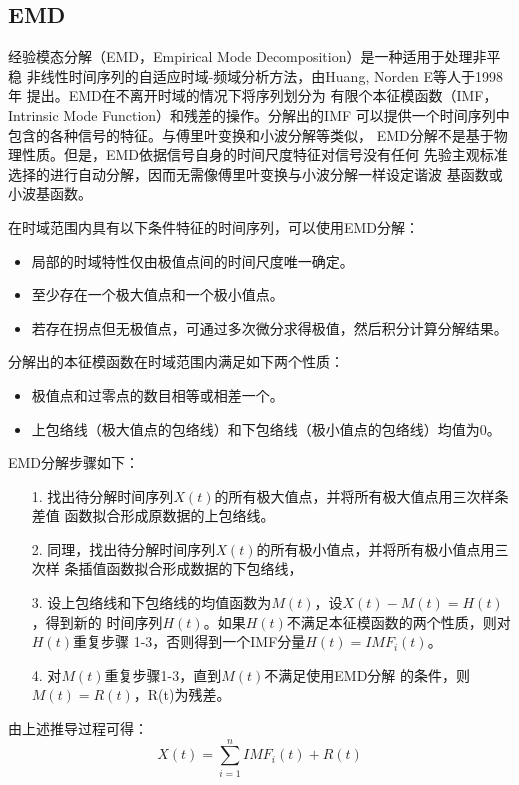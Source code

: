 \documentclass[AutoFakeBold]{LZUThesis}
\begin{document}
\subsection{EMD}
经验模态分解（EMD，Empirical Mode Decomposition）是一种适用于处理非平稳
非线性时间序列的自适应时域-频域分析方法，由Huang, Norden E等人于1998年
提出\cite{huang1998empirical}。EMD在不离开时域的情况下将序列划分为
有限个本征模函数（IMF，Intrinsic Mode Function）和残差的操作。分解出的IMF
可以提供一个时间序列中包含的各种信号的特征。与傅里叶变换和小波分解等类似，
EMD分解不是基于物理性质。但是，EMD依据信号自身的时间尺度特征对信号没有任何
先验主观标准选择的进行自动分解，因而无需像傅里叶变换与小波分解一样设定谐波
基函数或小波基函数。

在时域范围内具有以下条件特征的时间序列，可以使用EMD分解：
\begin{itemize}
\item 局部的时域特性仅由极值点间的时间尺度唯一确定。
\item 至少存在一个极大值点和一个极小值点。
\item 若存在拐点但无极值点，可通过多次微分求得极值，然后积分计算分解结果。
\end{itemize}

分解出的本征模函数在时域范围内满足如下两个性质：
\begin{itemize}
\item 极值点和过零点的数目相等或相差一个。
\item 上包络线（极大值点的包络线）和下包络线（极小值点的包络线）均值为0。
\end{itemize}

EMD分解步骤如下：
\begin{itemize}
\item[1. ] 找出待分解时间序列$X(t)$的所有极大值点，并将所有极大值点用三次样条差值
函数拟合形成原数据的上包络线。
\item[2. ] 同理，找出待分解时间序列$X(t)$的所有极小值点，并将所有极小值点用三次样
条插值函数拟合形成数据的下包络线，
\item[3. ] 设上包络线和下包络线的均值函数为$M(t)$，设$X(t)-M(t)=H(t)$，得到新的
时间序列$H(t)$。如果$H(t)$不满足本征模函数的两个性质，则对$H(t)$重复步骤
1-3，否则得到一个IMF分量$H(t)=IMF_i(t)$。
\item[4. ] 对$M(t)$重复步骤1-3，直到$M(t)$不满足使用EMD分解
的条件，则$M(t)=R(t)$，R(t)为残差。
\end{itemize}

由上述推导过程可得：
$$
X(t)=\displaystyle\sum_{i=1} ^n IMF_i(t) +R(t)
$$
\end{document}
